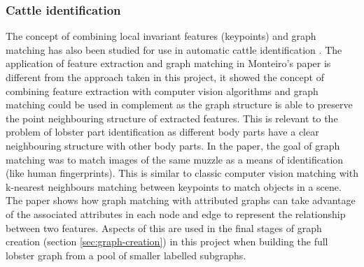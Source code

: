 \subsubsection{Cattle identification} \label{sec:cattle}
The concept of combining local invariant features (keypoints) and graph matching has also been studied for use in automatic cattle identification \cite{cattle}. The application of feature extraction and graph matching in Monteiro's paper is different from the approach taken in this project, it showed the concept of combining feature extraction with computer vision algorithms and graph matching could be used in complement as the graph structure is able to preserve the point neighbouring structure of extracted features. This is relevant to the problem of lobster part identification as different body parts have a clear neighbouring structure with other body parts.
\n
In the paper, the goal of graph matching was to match images of the same muzzle as a means of identification (like human fingerprints). This is similar to classic computer vision matching with k-nearest neighbours matching between keypoints to match objects in a scene. The paper shows how graph matching with attributed graphs can take advantage of the associated attributes in each node and edge to represent the relationship between two features. Aspects of this are used in the final stages of graph creation (section \ref{sec:graph-creation}) in this project when building the full lobster graph from a pool of smaller labelled subgraphs. 

